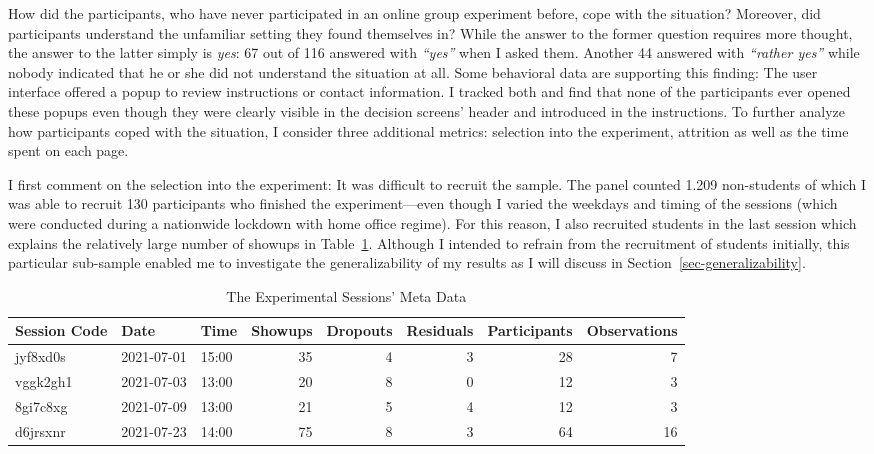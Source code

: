 \documentclass[
  authoryear,
  review,
  3p,
  onecolumn]{elsarticle}
\begin{document}
How did the participants, who have never participated in an online group
experiment before, cope with the situation? Moreover, did participants
understand the unfamiliar setting they found themselves in? While the
answer to the former question requires more thought, the answer to the
latter simply is \emph{yes}: 67 out of 116 answered with \emph{``yes''}
when I asked them. Another 44 answered with \emph{``rather yes''} while
nobody indicated that he or she did not understand the situation at all.
Some behavioral data are supporting this finding: The user interface
offered a popup to review instructions or contact information. I tracked
both and find that none of the participants ever opened these popups
even though they were clearly visible in the decision screens' header
and introduced in the instructions. To further analyze how participants
coped with the situation, I consider three additional metrics: selection
into the experiment, attrition as well as the time spent on each page.

I first comment on the selection into the experiment: It was difficult
to recruit the sample. The panel counted 1.209 non-students of which I
was able to recruit 130 participants who finished the experiment---even
though I varied the weekdays and timing of the sessions (which were
conducted during a nationwide lockdown with home office regime). For
this reason, I also recruited students in the last session which
explains the relatively large number of showups in Table~\ref{tbl-meta}.
Although I intended to refrain from the recruitment of students
initially, this particular sub-sample enabled me to investigate the
generalizability of my results as I will discuss in
Section~\ref{sec-generalizability}.

\hypertarget{tbl-meta}{}
\begin{table}
\caption{\label{tbl-meta}The Experimental Sessions' Meta Data }\tabularnewline

\centering
\begin{tabular}{l|l|l|r|r|r|r|r}
\hline
Session Code & Date & Time & Showups & Dropouts & Residuals & Participants & Observations\\
\hline
jyf8xd0s & 2021-07-01 & 15:00 & 35 & 4 & 3 & 28 & 7\\
\hline
vggk2gh1 & 2021-07-03 & 13:00 & 20 & 8 & 0 & 12 & 3\\
\hline
8gi7c8xg & 2021-07-09 & 13:00 & 21 & 5 & 4 & 12 & 3\\
\hline
d6jrsxnr & 2021-07-23 & 14:00 & 75 & 8 & 3 & 64 & 16\\
\hline
\end{tabular}
\end{table}
\end{document}
